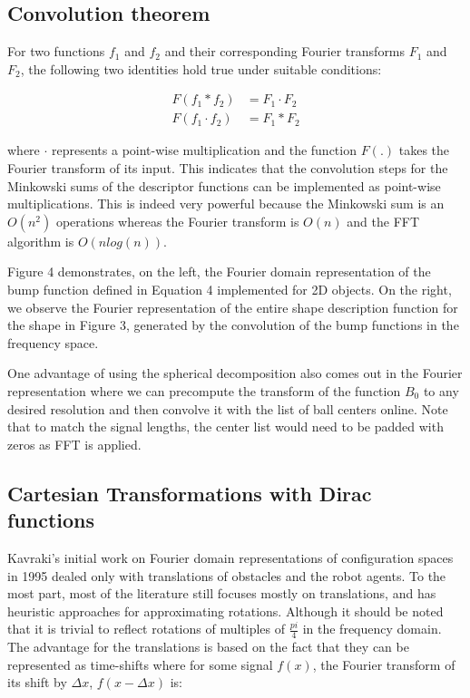 \documentclass[letterpaper, 10 pt, conference]{ieeeconf}
\begin{document}
\subsection{Convolution theorem}

For two functions $f_1$ and $f_2$ and their corresponding Fourier transforms $F_1$ and $F_2$, the
following two identities hold true under suitable conditions:

\begin{align}
 F(f_1 \ast f_2) &= F_1 \cdot F_2 \\ 
 F(f_1 \cdot f_2) &= F_1 \ast F_2
\end{align}

\noindent where $\cdot$ represents a point-wise multiplication and the function $F(.)$ takes the Fourier transform
of its input. This indicates that the convolution steps for the Minkowski sums of the descriptor functions
can be implemented as point-wise multiplications. This is indeed very powerful because the Minkowski sum 
is an $O(n^2)$ operations whereas the Fourier transform is $O(n)$ and the FFT algorithm is $O(nlog(n))$. 

Figure 4 demonstrates, on the left, the Fourier domain representation of the bump function defined in Equation 4 implemented
for 2D objects. On the right, we observe the Fourier representation of the entire shape description function
for the shape in Figure 3, generated by the convolution of the bump functions in the frequency space. 

One advantage of using the spherical decomposition also comes out in the Fourier representation where we can precompute
the transform of the function $B_0$ to any desired resolution and then convolve it with the list of ball centers
online. Note that to match the signal lengths, the center list would need to be padded with zeros as FFT is applied. 

\subsection{Cartesian Transformations with Dirac functions}

Kavraki's initial work on Fourier domain representations of configuration spaces in 1995 \cite{kavraki1995computation} 
dealed only with translations of obstacles and the robot agents. To the most part, most of the literature still focuses
mostly on translations, and has heuristic approaches for approximating rotations. Although it should be noted that
it is trivial to reflect rotations of multiples of $\tfrac{pi}{4}$ in the frequency domain. The advantage for
the translations is based on the fact that they can be represented as time-shifts where for some signal
$f(x)$, the Fourier transform of its shift by $\Delta x$, $f(x - \Delta x)$ is:
\end{document}
